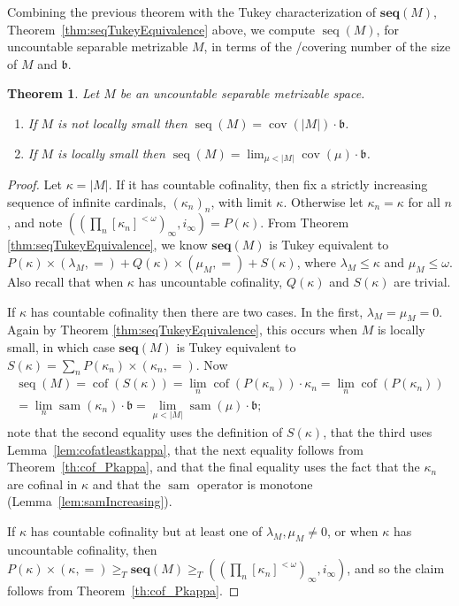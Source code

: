\documentclass{article}
\newtheorem{thm}{Theorem}[section]
\newcommand{\gtq}{\ge_{T}}
\DeclareMathOperator{\cof}{cof}
\begin{document}
Combining the previous theorem with the Tukey characterization of $\mathbf{seq}(M)$, Theorem~\ref{thm:seqTukeyEquivalence} above, we compute $\mathop{seq}(M)$, for uncountable separable metrizable $M$, in terms of the /covering number of the size of $M$ and $\mathfrak{b}$. 
\begin{thm}\label{th:seq_sam}
     Let $M$ be an uncountable separable metrizable space. 
\begin{enumerate}[noitemsep,topsep=1pt]
\item[(i)] If $M$ is not locally small then 
   $\mathop{seq}(M)= \mathop{cov}(|M|) \cdot \mathfrak{b}$.
     
\item[(ii)]      If $M$ is locally small then $\mathop{seq}(M)=\lim_{\mu <|M|} \mathop{cov}(\mu)\cdot \mathfrak{b}$.    
\end{enumerate}
   \end{thm}

   \begin{proof}
   Let $\kappa=|M|$.  If it has countable cofinality, then fix a strictly increasing sequence of infinite cardinals, $(\kappa_n)_n$, with limit $\kappa$. Otherwise let $\kappa_n=\kappa$ for all $n$, and note $(\left(\prod_n [\kappa_n]^{<\omega}\right)_\infty,i_\infty)= P(\kappa)$.
From Theorem \ref{thm:seqTukeyEquivalence}, we know $\mathbf{seq}(M)$ is Tukey equivalent to 
$P(\kappa) \times (\lambda_M,=) + Q(\kappa) \times (\mu_M,=) + S(\kappa)$,  
where $\lambda_M \le \kappa$ and $\mu_M \le \omega$. Also recall that when $\kappa$ has uncountable cofinality, $Q(\kappa)$ and $S(\kappa)$ are trivial.

If $\kappa$ has countable cofinality then there are two cases. In the first, $\lambda_M=\mu_M=0$. Again by Theorem \ref{thm:seqTukeyEquivalence}, this occurs when $M$ is locally small, in which case $\mathbf{seq}(M)$ is Tukey equivalent to $S(\kappa)=\sum_n P(\kappa_n) \times (\kappa_n,=)$. Now 
\begin{multline*}
\mathop{seq}(M)=\cof(S(\kappa))=\lim_n \cof(P(\kappa_n))\cdot\kappa_n =\lim_n\cof(P(\kappa_n)) \\
=\lim_n\mathop{sam}(\kappa_n)\cdot\mathfrak{b}=\lim_{\mu <|M|} \mathop{sam}(\mu)\cdot \mathfrak{b};
\end{multline*}
note that the second equality uses the definition of $S(\kappa)$, that the third uses Lemma~\ref{lem:cofatleastkappa}, that the next equality follows from Theorem~\ref{th:cof_Pkappa}, and that the final equality uses the fact that the $\kappa_n$ are cofinal in $\kappa$ and that the $\mathop{sam}$ operator is monotone (Lemma~\ref{lem:samIncreasing}).

If $\kappa$ has countable cofinality but at least one of $\lambda_M, \mu_M \ne 0$, or when $\kappa$ has uncountable cofinality, then $P(\kappa)\times (\kappa,=) \gtq \mathbf{seq}(M) \gtq (\left(\prod_n [\kappa_n]^{<\omega}\right)_\infty,i_\infty)$, and so the claim follows from Theorem~\ref{th:cof_Pkappa}.    
\end{proof}
   
\end{document}
